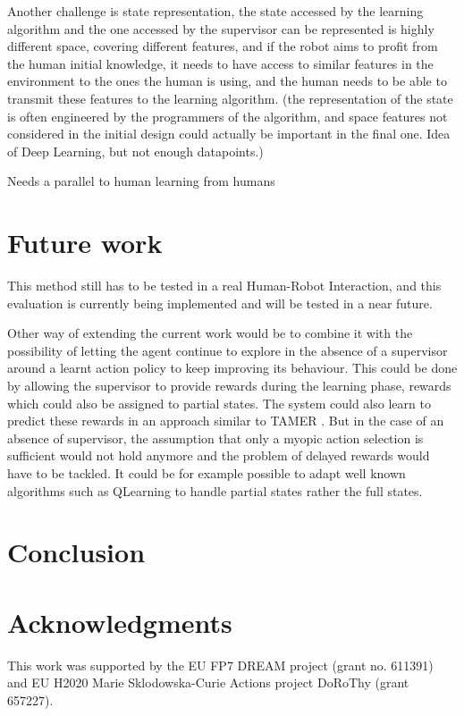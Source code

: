 \documentclass[letterpaper]{article} %
\begin{document}
Another challenge is state representation, the state accessed by the learning
algorithm and the one accessed by the supervisor can be represented is highly
different space, covering different features, and if the robot aims to profit
from the human initial knowledge, it needs to have access to similar features in
the environment to the ones the human is using, and the human needs to be able
to transmit these features to the learning algorithm.
(the representation of the state is often engineered by the programmers of the
algorithm, and space features not considered in the initial design could
actually be important in the final one. Idea of Deep Learning, but not enough
datapoints.)

Needs a parallel to human learning from humans

\section{Future work}

This method still has to be tested in a real Human-Robot Interaction, and this
evaluation is currently being implemented and will be tested in a near future.

Other way of extending the current work would be to combine it with the
possibility of letting the agent continue to explore in the absence of a
supervisor around a learnt action policy to keep improving its behaviour. This
could be done by allowing the supervisor to provide rewards during the learning
phase, rewards which could also be assigned to partial states. The system could
also learn to predict these rewards in an approach similar to TAMER 
\cite{knox2009interactively}. But in the case of an absence of supervisor, the assumption that only a
myopic action selection is sufficient would not hold anymore and the problem of
delayed rewards would have to be tackled. It could be for example possible to
adapt well known algorithms such as QLearning to handle partial states rather
the full states.

\section{Conclusion}
\label{sec:conclusion}
\section{Acknowledgments}
This work was supported by the EU FP7 DREAM project (grant no.  611391) and EU
H2020 Marie Sklodowska-Curie Actions project DoRoThy (grant 657227).  

 
\end{document}
